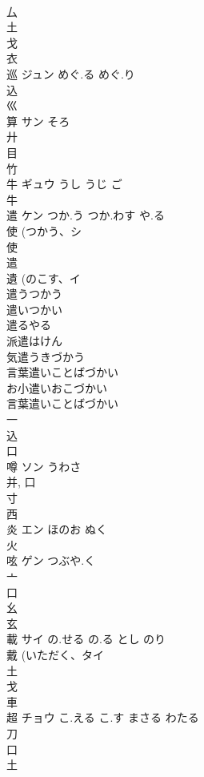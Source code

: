\documentclass[8pt]{extreport}
\begin{document}
\begin{CJK}{UTF8}{min}
\\	厶 
\\	土 
\\	戈 
\\	衣 
\\	巡	ジュン	めぐ.る めぐ.り	
\\	込 
\\	巛 
\\	算	サン	そろ	
\\	廾 
\\	目 
\\	竹 
\\	牛	ギュウ	うし うじ ご	
\\	牛 
\\	遣	ケン	つか.う つか.わす や.る	
\\	使 (つかう、シ 
\\	使 
\\	遣 
\\	遺 (のこす、イ 
\\	遣うつかう
\\	遣いつかい
\\	遣るやる
\\	派遣はけん
\\	気遣うきづかう
\\	言葉遣いことばづかい
\\	お小遣いおこづかい 
\\	言葉遣いことばづかい 
\\	一 
\\	込 
\\	口 
\\	噂	ソン	うわさ	
\\	并, 口 
\\	寸 
\\	西 
\\	炎	エン	ほのお ぬく	
\\	火 
\\	呟	ゲン	つぶや.く	
\\	亠 
\\	口 
\\	幺 
\\	玄 
\\	載	サイ	の.せる の.る とし のり	
\\	戴 (いただく、タイ
\\	土 
\\	戈 
\\	車 
\\	超	チョウ	こ.える こ.す まさる わたる	
\\	刀 
\\	口 
\\	土 

\end{CJK}
\end{document}
